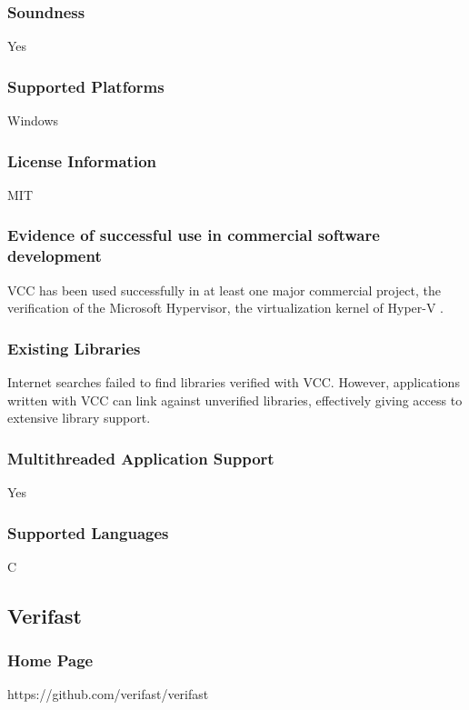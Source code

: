 \documentclass[11pt]{article}
\begin{document}
	\subsubsection{Soundness}
	Yes

	\subsubsection{Supported Platforms}
	Windows

	\subsubsection{License Information}
	MIT \cite{vcc01}

	\subsubsection{Evidence of successful use in commercial software development}
		VCC has been used successfully in at least one major commercial project, the verification of the Microsoft Hypervisor, the virtualization kernel of Hyper-V \cite{vcc2}.

	\subsubsection{Existing Libraries}
		Internet searches failed to find libraries verified with VCC. However, applications written with VCC can link against unverified libraries, effectively giving access to extensive library support.

	\subsubsection{Multithreaded Application Support}
	Yes

	\subsubsection{Supported Languages}
	C




\subsection{Verifast}
	\subsubsection{Home Page}%
	https://github.com/verifast/verifast
\end{document}
